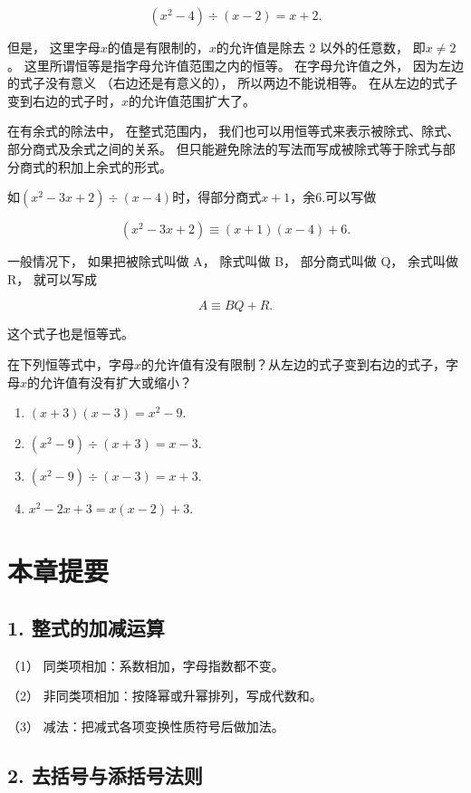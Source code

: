 \[
(x ^{2} - 4) \div (x - 2) = x + 2.
\]

但是， 这里字母\(x\)的值是有限制的，\(x\)的允许值是除去 2 以外的任意数，
即\(x \neq 2\)。 这里所谓恒等是指字母允许值范围之内的恒等。
在字母允许值之外， 因为左边的式子没有意义 （右边还是有意义的），
所以两边不能说相等。
在从左边的式子变到右边的式子时，\(x\)的允许值范围扩大了。

在有余式的除法中， 在整式范围内，
我们也可以用恒等式来表示被除式、除式、部分商式及余式之间的关系。
但只能避免除法的写法而写成被除式等于除式与部分商式的积加上余式的形式。

如\((x^{2} - 3x + 2) \div (x - 4)\)时，得部分商式\(x + 1\)，余6.可以写做

\[
(x ^{2} - 3 x + 2) \equiv (x + 1) (x - 4) + 6.
\]

一般情况下， 如果把被除式叫做 A， 除式叫做 B， 部分商式叫做 Q， 余式叫做
R， 就可以写成

\[
A \equiv B Q + R.
\]

这个式子也是恒等式。

在下列恒等式中，字母\(x\)的允许值有没有限制？从左边的式子变到右边的式子，字母\(x\)的允许值有没有扩大或缩小？

\begin{enumerate}[start=1]
\item
  \((x + 3)(x - 3) = x^2 -9.\)
\item
  \((x^{2} - 9)\div (x + 3) = x - 3.\)
\item
  \((x^{2} - 9)\div (x - 3) = x + 3.\)
\item
  \(x^{2} - 2x + 3 = x(x - 2) + 3.\)
\end{enumerate}

\section{本章提要}

\subsection{1. 整式的加减运算}

（1） 同类项相加：系数相加，字母指数都不变。

（2） 非同类项相加：按降幂或升幂排列，写成代数和。

（3） 减法：把减式各项变换性质符号后做加法。

\subsection{2. 去括号与添括号法则}

